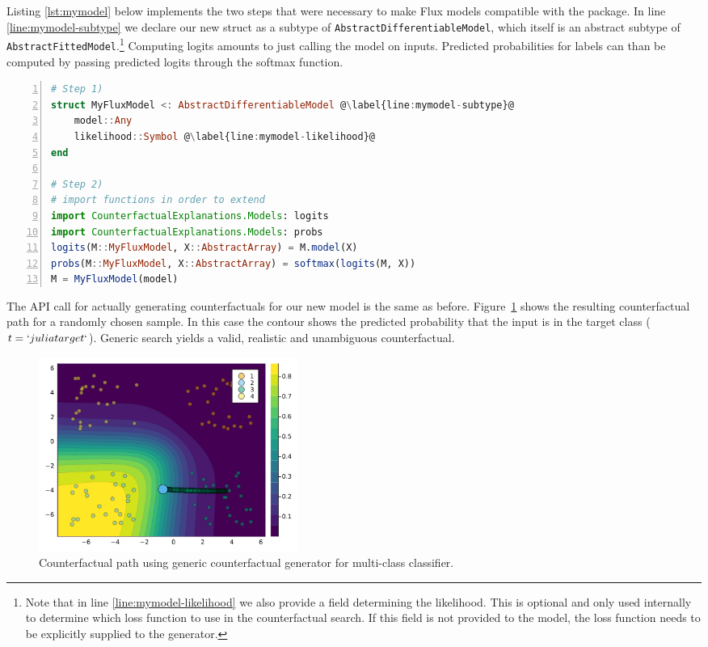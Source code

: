 \documentclass{juliacon}
\begin{document}
Listing \ref{lst:mymodel} below implements the two steps that were
necessary to make Flux models compatible with the package. In line
\ref{line:mymodel-subtype} we declare our new struct as a subtype of
\texttt{AbstractDifferentiableModel}, which itself is an abstract
subtype of \texttt{AbstractFittedModel}.\footnote{Note that in line
  \ref{line:mymodel-likelihood} we also provide a field determining the
  likelihood. This is optional and only used internally to determine
  which loss function to use in the counterfactual search. If this field
  is not provided to the model, the loss function needs to be explicitly
  supplied to the generator.} Computing logits amounts to just calling
the model on inputs. Predicted probabilities for labels can than be
computed by passing predicted logits through the softmax function.

\begin{lstlisting}[language=Julia, escapechar=@, numbers=left, label={lst:mymodel}, caption={.}]
# Step 1)
struct MyFluxModel <: AbstractDifferentiableModel @\label{line:mymodel-subtype}@
    model::Any
    likelihood::Symbol @\label{line:mymodel-likelihood}@
end

# Step 2)
# import functions in order to extend
import CounterfactualExplanations.Models: logits
import CounterfactualExplanations.Models: probs 
logits(M::MyFluxModel, X::AbstractArray) = M.model(X)
probs(M::MyFluxModel, X::AbstractArray) = softmax(logits(M, X))
M = MyFluxModel(model)
\end{lstlisting}

The API call for actually generating counterfactuals for our new model
is the same as before. Figure~\ref{fig-multi} shows the resulting
counterfactual path for a randomly chosen sample. In this case the
contour shows the predicted probability that the input is in the target
class (\(t=`julia target`\)). Generic search yields a valid, realistic
and unambiguous counterfactual.

\begin{figure}

{\centering \includegraphics[width=3.33333in,height=2.5in]{www/ce_multi.png}

}

\caption{\label{fig-multi}Counterfactual path using generic
counterfactual generator for multi-class classifier.}

\end{figure}
\end{document}
